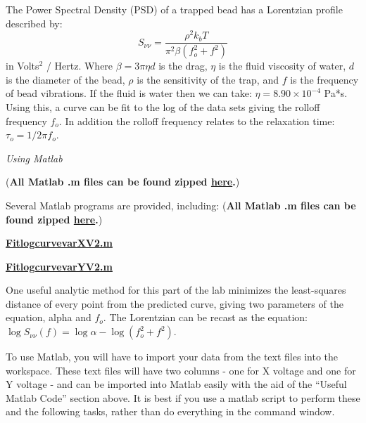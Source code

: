 \documentclass{../lab}
\begin{document}
The Power Spectral Density (PSD) \cite{Reif} of a trapped bead has a Lorentzian profile described by:
\begin{equation}
    S_{\nu\nu} = \frac{\rho^2 k_b T}{\pi^2 \beta(f_o^2+f^2)}
\end{equation}
in Volts$^2$ / Hertz. Where $\beta = 3\pi\eta d$ is the drag, $\eta$ is the fluid viscosity of water, $d$ is the diameter of the bead, $\rho$ is the sensitivity of the trap, and $f$ is the frequency of bead vibrations. If the fluid is water then we can take: $\eta = 8.90 \times 10^{-4}$ Pa*s. Using this, a curve can be fit to the log of the data sets giving the rolloff frequency $f_o$. In addition the rolloff frequency relates to the relaxation time: $\tau_o = 1/2\pi f_o$.

\emph{Using Matlab}

(\textbf{All Matlab .m files can be found zipped  \href{http://dev-physicsadv.pantheon.berkeley.edu/sites/default/files/ZIP\_files/OTZ\_Matlab\_files.zip}{here}.})

Several Matlab programs are provided, including: (\textbf{All Matlab .m files can be found zipped  \href{http://dev-physicsadv.pantheon.berkeley.edu/sites/default/files/ZIP\_files/OTZ\_Matlab\_files.zip}{here}.})

\href{http://dev-physicsadv.pantheon.berkeley.edu/sites/default/files/matlab\_fitting/FitlogcurvevarXV2.m}{\textbf{FitlogcurvevarXV2.m}}

\href{http://dev-physicsadv.pantheon.berkeley.edu/sites/default/files/matlab\_fitting/FitlogcurvevarYV2.m}{\textbf{FitlogcurvevarYV2.m}}

One useful analytic method for this part of the lab minimizes the least-squares distance of every point from the predicted curve, giving two parameters of the equation, alpha and $f_o$. The Lorentzian can be recast as the equation: $\log{S_{\nu\nu}(f)} = \log{\alpha} - \log{(f_o^2+f^2)}$.

To use Matlab, you will have to import your data from the text files into the workspace. These text files will have two columns - one for X voltage and one for Y voltage - and can be imported into Matlab easily with the aid of the ``Useful Matlab Code'' section above. It is best if you use a matlab script to perform these and the following tasks, rather than do everything in the command window.
\end{document}
